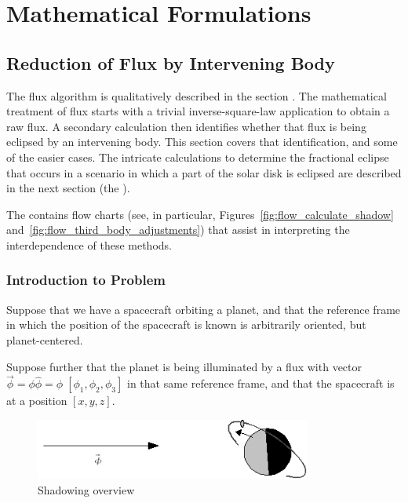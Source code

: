 %
%
%

\section{Mathematical Formulations}\label{sec:mathformulations}

 \subsection{Reduction of Flux by Intervening Body}\label{ref:shadowcalculator}
 The flux algorithm is qualitatively described in the section
 .
 The mathematical treatment of flux starts with a trivial inverse-square-law
 application to obtain a raw flux.  A secondary calculation then identifies
 whether that flux is being eclipsed by an intervening body.  This section
 covers that identification, and some of the easier cases.  The intricate
 calculations to determine the fractional eclipse that occurs in a scenario
 in which a part of the solar disk is eclipsed are described in the next
 section (the ).

 The 
 contains flow charts (see, in particular, Figures~\ref{fig:flow_calculate_shadow}
 and~\ref{fig:flow_third_body_adjustments}) that assist
 in interpreting the interdependence of these methods.

\subsubsection{Introduction to Problem}
  Suppose that we have a spacecraft orbiting a planet, and that the
  reference frame in which the position of the spacecraft is known is
  arbitrarily oriented, but planet{}-centered.

  Suppose further that the planet is being illuminated by a flux with
  vector \  $\vec{\phi }=\phi \hat{\phi }=\phi \; [\phi _{1},\phi _{2},\phi
  _{3}]$ in that same reference frame, and that the spacecraft is at a
  position  $[x,y,z]$.
  \bigskip
  \bigskip
  \begin{figure}[!ht]
  \begin{center}
    \includegraphics[height=20mm]{figs/shadow/shadow_seeker_fig1.jpg}
    \end{center}
    \caption{Shadowing overview}
    \label{fig:shadow_seeker1}
  \end{figure}

